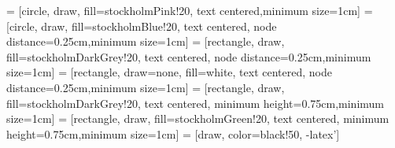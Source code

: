  = [circle, draw, fill=stockholmPink!20, text centered,minimum size=1cm]
 = [circle, draw, fill=stockholmBlue!20, text centered, node distance=0.25cm,minimum size=1cm]
 = [rectangle, draw, fill=stockholmDarkGrey!20, text centered, node distance=0.25cm,minimum size=1cm]
 = [rectangle, draw=none, fill=white, text centered, node distance=0.25cm,minimum size=1cm]
 = [rectangle, draw, fill=stockholmDarkGrey!20, text centered, minimum height=0.75cm,minimum size=1cm]
 = [rectangle, draw, fill=stockholmGreen!20, text centered, minimum height=0.75cm,minimum size=1cm]
 = [draw, color=black!50, -latex']
